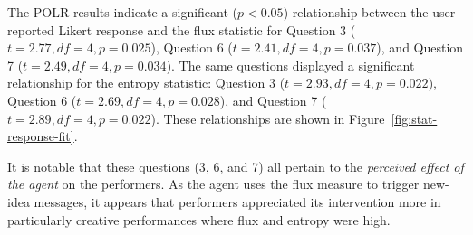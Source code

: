 \documentclass{sigchi}
\begin{document}
The POLR results indicate a significant ($p<0.05$) relationship
between the user-reported Likert response and the flux statistic for
Question 3 ($t = 2.77, df = 4, p = 0.025$), Question 6
($t = 2.41, df = 4, p = 0.037$), and Question 7
($t = 2.49, df = 4, p = 0.034$). The same questions displayed a
significant relationship for the entropy statistic: Question 3
($t = 2.93, df = 4, p = 0.022$), Question 6
($t = 2.69, df = 4, p = 0.028$), and Question 7
($t = 2.89, df = 4, p = 0.022$). These relationships are shown in
Figure~\ref{fig:stat-response-fit}.

It is notable that these questions (3, 6, and 7) all pertain to the
\emph{perceived effect of the agent} on the performers. As the agent
uses the flux measure to trigger new-idea messages, it appears that
performers appreciated its intervention more in particularly creative
performances where flux and entropy were high.








\end{document}
